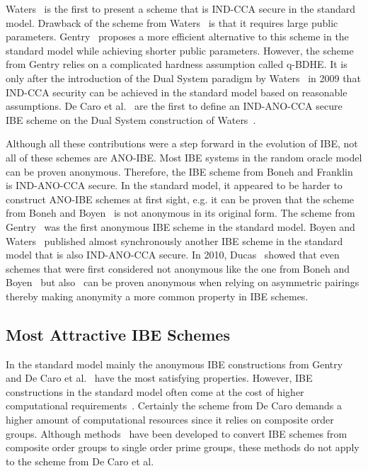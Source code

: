 Waters~\cite{art:Waters05} is the first to present a scheme that is IND-CCA secure in the standard model. Drawback of the scheme from Waters~\cite{art:Waters05} is that it requires large public parameters. Gentry~\cite{art:Gentry06} proposes a more efficient alternative to this scheme in the standard model while achieving shorter public parameters. However, the scheme from Gentry relies on a complicated hardness assumption called q-BDHE. It is only after the introduction of the Dual System paradigm by Waters~\cite{art:Waters09} in 2009 that IND-CCA security can be achieved in the standard model based on reasonable assumptions. De Caro et al.~\cite{art:CaroIP10} are the first to define an IND-ANO-CCA secure IBE scheme on the Dual System construction of Waters~\cite{art:Waters09}. %

Although all these contributions were a step forward in the evolution of IBE, not all of these schemes are ANO-IBE. Most IBE systems in the random oracle model can be proven anonymous. Therefore, the IBE scheme from Boneh and Franklin~\cite{art:BonehF01} is IND-ANO-CCA secure. In the standard model, it appeared to be harder to construct ANO-IBE schemes at first sight, e.g. it can be proven that the scheme from Boneh and Boyen~\cite{art:BonehB04} is not anonymous in its original form. The scheme from Gentry~\cite{art:Gentry06} was the first anonymous IBE scheme in the standard model. Boyen and Waters~\cite{art:BoyenW06} published almost synchronously another IBE scheme in the standard model that is also IND-ANO-CCA secure. In 2010, Ducas~\cite{art:Ducas10} showed that even schemes that were first considered not anonymous like the one from Boneh and Boyen~\cite{art:BonehB04} but also~\cite{art:BonehBG05,art:Waters05} can be proven anonymous when relying on asymmetric pairings thereby making anonymity a more common property in IBE schemes.

\subsection{Most Attractive IBE Schemes}
In the standard model mainly the anonymous IBE constructions from Gentry~\cite{art:Gentry06} and De Caro et al.~\cite{art:CaroIP10} have the most satisfying properties. However, IBE constructions in the standard model often come at the cost of higher computational requirements~\cite{art:Boyen08}. Certainly the scheme from De Caro demands a higher amount of computational resources since it relies on composite order groups. Although methods~\cite{art:Freeman10,art:Lewko12} have been developed to convert IBE schemes from composite order groups to single order prime groups, these methods do not apply to the scheme from De Caro et al.~\cite{art:LeeL10}

